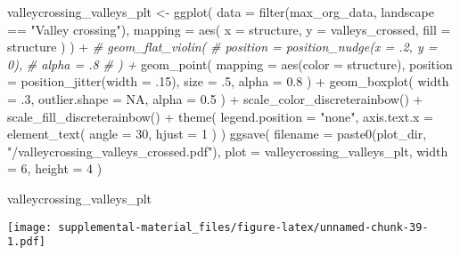 \documentclass[
]{book}
\newenvironment{Shaded}{\begin{snugshade}}{\end{snugshade}}
\newcommand{\AttributeTok}[1]{\textcolor[rgb]{0.77,0.63,0.00}{#1}}
\newcommand{\CommentTok}[1]{\textcolor[rgb]{0.56,0.35,0.01}{\textit{#1}}}
\newcommand{\ConstantTok}[1]{\textcolor[rgb]{0.00,0.00,0.00}{#1}}
\newcommand{\DecValTok}[1]{\textcolor[rgb]{0.00,0.00,0.81}{#1}}
\newcommand{\FloatTok}[1]{\textcolor[rgb]{0.00,0.00,0.81}{#1}}
\newcommand{\FunctionTok}[1]{\textcolor[rgb]{0.00,0.00,0.00}{#1}}
\newcommand{\NormalTok}[1]{#1}
\newcommand{\OtherTok}[1]{\textcolor[rgb]{0.56,0.35,0.01}{#1}}
\newcommand{\SpecialCharTok}[1]{\textcolor[rgb]{0.00,0.00,0.00}{#1}}
\newcommand{\StringTok}[1]{\textcolor[rgb]{0.31,0.60,0.02}{#1}}
\begin{document}
\begin{Shaded}
\begin{Highlighting}[]
\NormalTok{valleycrossing\_valleys\_plt }\OtherTok{\textless{}{-}} \FunctionTok{ggplot}\NormalTok{(}
    \AttributeTok{data =} \FunctionTok{filter}\NormalTok{(max\_org\_data, landscape }\SpecialCharTok{==} \StringTok{"Valley crossing"}\NormalTok{),}
    \AttributeTok{mapping =} \FunctionTok{aes}\NormalTok{(}
      \AttributeTok{x =}\NormalTok{ structure,}
      \AttributeTok{y =}\NormalTok{ valleys\_crossed,}
      \AttributeTok{fill =}\NormalTok{ structure}
\NormalTok{    )}
\NormalTok{  ) }\SpecialCharTok{+}
  \CommentTok{\# geom\_flat\_violin(}
  \CommentTok{\#   position = position\_nudge(x = .2, y = 0),}
  \CommentTok{\#   alpha = .8}
  \CommentTok{\# ) +}
  \FunctionTok{geom\_point}\NormalTok{(}
    \AttributeTok{mapping =} \FunctionTok{aes}\NormalTok{(}\AttributeTok{color =}\NormalTok{ structure),}
    \AttributeTok{position =} \FunctionTok{position\_jitter}\NormalTok{(}\AttributeTok{width =}\NormalTok{ .}\DecValTok{15}\NormalTok{),}
    \AttributeTok{size =}\NormalTok{ .}\DecValTok{5}\NormalTok{,}
    \AttributeTok{alpha =} \FloatTok{0.8}
\NormalTok{  ) }\SpecialCharTok{+}
  \FunctionTok{geom\_boxplot}\NormalTok{(}
    \AttributeTok{width =}\NormalTok{ .}\DecValTok{3}\NormalTok{,}
    \AttributeTok{outlier.shape =} \ConstantTok{NA}\NormalTok{,}
    \AttributeTok{alpha =} \FloatTok{0.5}
\NormalTok{  ) }\SpecialCharTok{+}
  \FunctionTok{scale\_color\_discreterainbow}\NormalTok{() }\SpecialCharTok{+}
  \FunctionTok{scale\_fill\_discreterainbow}\NormalTok{() }\SpecialCharTok{+}
  \FunctionTok{theme}\NormalTok{(}
    \AttributeTok{legend.position =} \StringTok{"none"}\NormalTok{,}
    \AttributeTok{axis.text.x =} \FunctionTok{element\_text}\NormalTok{(}
      \AttributeTok{angle =} \DecValTok{30}\NormalTok{,}
      \AttributeTok{hjust =} \DecValTok{1}
\NormalTok{    )}
\NormalTok{  )}
\FunctionTok{ggsave}\NormalTok{(}
  \AttributeTok{filename =} \FunctionTok{paste0}\NormalTok{(plot\_dir, }\StringTok{"/valleycrossing\_valleys\_crossed.pdf"}\NormalTok{),}
  \AttributeTok{plot =}\NormalTok{ valleycrossing\_valleys\_plt,}
  \AttributeTok{width =} \DecValTok{6}\NormalTok{,}
  \AttributeTok{height =} \DecValTok{4}
\NormalTok{)}

\NormalTok{valleycrossing\_valleys\_plt}
\end{Highlighting}
\end{Shaded}

\texttt{[image: supplemental-material\_files/figure-latex/unnamed-chunk-39-1.pdf]}
\end{document}
